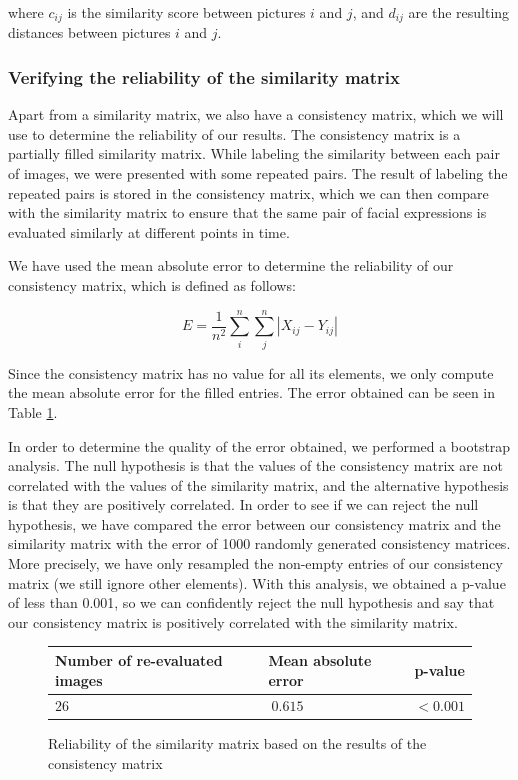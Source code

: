 \documentclass[11pt, a4paper]{article}
\numberwithin{equation}{subsection}
\begin{document}
where $c_{ij}$ is the similarity score between pictures $i$ and $j$, and $d_{ij}$ are the resulting distances between pictures $i$ and $j$.


\subsubsection{Verifying the reliability of the similarity matrix}\label{analysis_sim_matrix}

Apart from a similarity matrix, we also have a consistency matrix, which we will use to determine the reliability of our results. The consistency matrix is a partially filled similarity matrix. While labeling the similarity between each pair of images, we were presented with some repeated pairs. The result of labeling the repeated pairs is stored in the consistency matrix, which we can then compare with the similarity matrix to ensure that the same pair of facial expressions is evaluated similarly at different points in time.

We have used the mean absolute error to determine the reliability of our consistency matrix, which is defined as follows:

\begin{equation}\label{eq:mean_abs_error}
    E = \frac{1}{n^2} \sum_i^n\sum_j^n |{X_{ij} - Y_{ij}}|
\end{equation}

Since the consistency matrix has no value for all its elements, we only compute the mean absolute error for the filled entries. The error obtained can be seen in Table \ref{tab:similarity_reliability}.

In order to determine the quality of the error obtained, we performed a bootstrap analysis. The null hypothesis is that the values of the consistency matrix are not correlated with the values of the similarity matrix, and the alternative hypothesis is that they are positively correlated. In order to see if we can reject the null hypothesis, we have compared the error between our consistency matrix and the similarity matrix with the error of 1000 randomly generated consistency matrices. More precisely, we have only resampled the non-empty entries of our consistency matrix (we still ignore other elements). With this analysis, we obtained a p-value of less than 0.001, so we can confidently reject the null hypothesis and say that our consistency matrix is positively correlated with the similarity matrix.

\begin{figure}[h]
    \centering
    \begin{tabular}{l|l|l}
            \textbf{Number of re-evaluated images} & \textbf{Mean absolute error} & \textbf{p-value} \\ \hline
            $26$                                     & $~0.615$                       & $< 0.001$          \\
    \end{tabular}
    \captionsetup{type=table}
    \caption{Reliability of the similarity matrix based on the results of the consistency matrix}
    \label{tab:similarity_reliability}
\end{figure}
\end{document}
